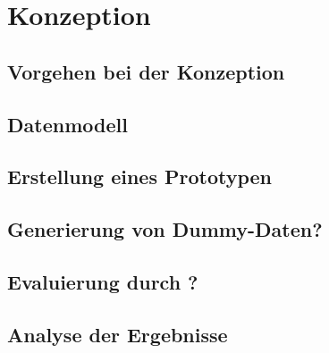 \chapter{Konzeption}
\label{konzept}
\lipsum[1-60]
\section{Vorgehen bei der Konzeption}
\section{Datenmodell}
\section{Erstellung eines Prototypen}
\section{Generierung von Dummy-Daten?}
\section{Evaluierung durch ?}
\section{Analyse der Ergebnisse}